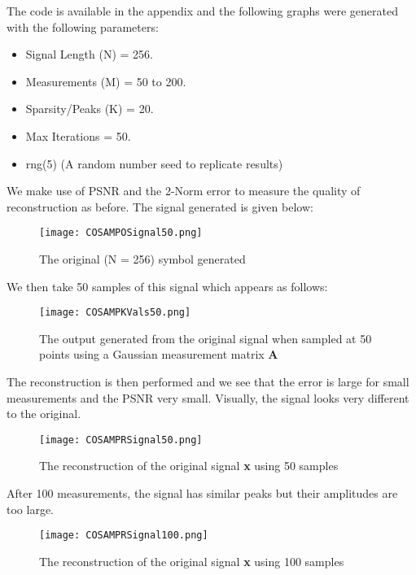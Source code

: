 \documentclass[titlepage,oneside, 12pt]{book}
\theoremstyle{break}
\begin{document}
The code is available in the appendix and the following graphs were generated with the following parameters:

\begin{itemize}
\item Signal Length (N) = 256.
\item Measurements (M) = 50 to 200. 
\item Sparsity/Peaks (K) = 20.
\item Max Iterations = 50.
\item rng(5) (A random number seed to replicate results)
\end{itemize}

We make use of PSNR and the 2-Norm error to measure the quality of reconstruction as before. The signal generated is given below:

\begin{figure}[h]
\centering
\centerline{\texttt{[image: COSAMPOSignal50.png]}}
\caption{The original (N = 256) symbol generated}
\label{fig:COSAMPOSignal50}
\end{figure}

We then take 50 samples of this signal which appears as follows:

\begin{figure}[H]
\centering
\centerline{\texttt{[image: COSAMPKVals50.png]}}
\caption{The output generated from the original signal when sampled at 50 points using a Gaussian measurement matrix \textbf{A} }
\label{fig:COSAMPKVals50}
\end{figure}

The reconstruction is then performed and we see that the error is large for small measurements and the PSNR very small. Visually, the signal looks very different to the original. 

\begin{figure}[H]
\centering
\centerline{\texttt{[image: COSAMPRSignal50.png]}}
\caption{The reconstruction of the original signal \textbf{x} using 50 samples}
\label{fig:COSAMPRSignal50}
\end{figure}
After 100 measurements, the signal has similar peaks but their amplitudes are too large. 

\begin{figure}[H]
\centering
\centerline{\texttt{[image: COSAMPRSignal100.png]}}
\caption{The reconstruction of the original signal \textbf{x} using 100 samples}
\label{fig:COSAMPRSignal100}
\end{figure}
\end{document}
